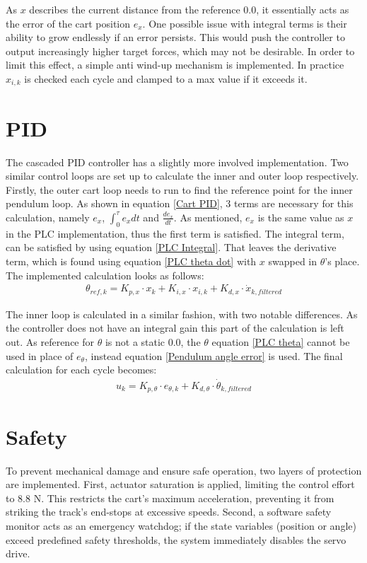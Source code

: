 As $x$ describes the current distance from the reference $0.0$, it essentially acts as the error of the cart position $e_x$. One possible issue with integral terms is their ability to grow endlessly if an error persists. This would push the controller to output increasingly higher target forces, which may not be desirable. In order to limit this effect, a simple anti wind-up mechanism is implemented. In practice $x_{i,k}$ is checked each cycle and clamped to a max value if it exceeds it. 

\section{PID}
The cascaded PID controller has a slightly more involved implementation. Two similar control loops are set up to calculate the inner and outer loop respectively. Firstly, the outer cart loop needs to run to find the reference point for the inner pendulum loop. As shown in equation \ref{Cart PID}, 3 terms are necessary for this calculation, namely $e_x$, $\int_{0}^{\tau} e_x dt$ and $\frac{d e_x}{dt}$. As mentioned, $e_x$ is the same value as $x$ in the PLC implementation, thus the first term is satisfied. The integral term, can be satisfied by using equation \ref{PLC Integral}. That leaves the derivative term, which is found using equation \ref{PLC theta dot} with $x$ swapped in $\theta$'s place. The implemented calculation looks as follows:
\begin{align}
	\theta_{ref,k} = K_{p,x} \cdot x_k + K_{i,x} \cdot x_{i,k} + K_{d,x} \cdot \dot{x}_{k,filtered}
\end{align}

The inner loop is calculated in a similar fashion, with two notable differences. As the controller does not have an integral gain this part of the calculation is left out. As reference for $\theta$ is not a static 0.0, the $\theta$ equation \ref{PLC theta} cannot be used in place of $e_{\theta}$, instead equation \ref{Pendulum angle error} is used. The final calculation for each cycle becomes:
\begin{align}
	u_k = K_{p,\theta} \cdot e_{\theta,k} + K_{d,\theta} \cdot \dot{\theta}_{k,filtered}
\end{align}


\section{Safety}
To prevent mechanical damage and ensure safe operation, two layers of protection are implemented. First, actuator saturation is applied, limiting the control effort to 8.8 N. This restricts the cart's maximum acceleration, preventing it from striking the track’s end-stops at excessive speeds. Second, a software safety monitor acts as an emergency watchdog; if the state variables (position or angle) exceed predefined safety thresholds, the system immediately disables the servo drive.



